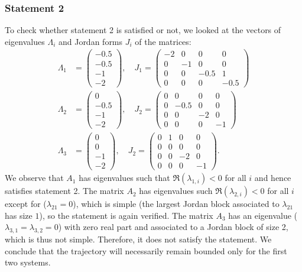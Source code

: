 \documentclass[11pt]{article}
\begin{document}
\subsubsection*{Statement 2}
To check whether statement 2 is satisfied or not, we looked at the vectors of eigenvalues $\Lambda_i$ and Jordan forms $J_i$ of the matrices:
\begin{align*}
    \Lambda_1 &=\begin{pmatrix}
    -0.5\\
    -0.5\\
    -1\\
    -2
    \end{pmatrix}, \quad
    J_1=\begin{pmatrix}
    -2 & 0 & 0 & 0\\
    0 &-1 & 0 & 0\\
    0 & 0 & -0.5 &1\\
    0 & 0 & 0 & -0.5
    \end{pmatrix}\\
    \Lambda_2 &=\begin{pmatrix}
    0\\
    -0.5\\
    -1\\
    -2
    \end{pmatrix}, \quad
    J_2=\begin{pmatrix}
    0 & 0 & 0 & 0\\
    0 &-0.5 & 0 & 0\\
    0 & 0 & -2 & 0\\
    0 & 0 & 0 & -1
    \end{pmatrix}\\
    \Lambda_3 &=\begin{pmatrix}
    0\\
    0\\
    -1\\
    -2
    \end{pmatrix}, \quad
    J_2=\begin{pmatrix}
    0 & 1 & 0 & 0\\
    0 & 0 & 0 & 0\\
    0 & 0 & -2 & 0\\
    0 & 0 & 0 & -1
    \end{pmatrix}.
\end{align*}
We observe that $A_1$ has eigenvalues such that $\Re(\lambda_{1, i})<0$ for all \(i\) and hence satisfies statement 2.
The matrix $A_2$ has eigenvalues such $\Re(\lambda_{2, i})<0$ for all \(i\) except for ($\lambda_{21}=0$), which is simple (the largest Jordan block associated to $\lambda_{21}$ has size \(1\)), so the statement is again verified.
The matrix $A_3$ has an eigenvalue ($\lambda_{3, 1} = \lambda_{3, 2} = 0$) with zero real part and associated to a Jordan block of size 2, which is thus not simple.
Therefore, it does not satisfy the statement. We conclude that the trajectory will necessarily remain bounded only for the first two systems.
\end{document}
